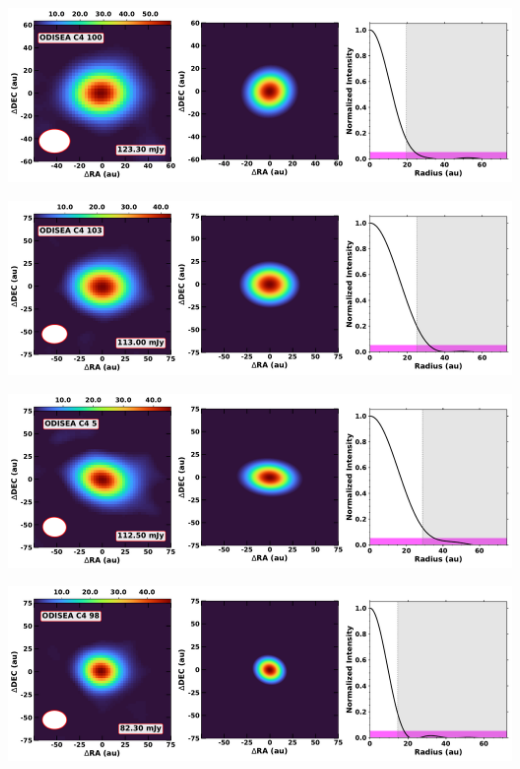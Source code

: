 \noindent
\begin{minipage}{.49\textwidth}
	 \centering
	 	 \hrulesep
	 	 \includegraphics[width=1\linewidth]{pdf/0+II/070_odisea_c4_100_cutout.pdf}
\end{minipage}%
\vrulesep
\begin{minipage}{.49\textwidth}
	 \centering
	 	 \hrulesep
	 	 \includegraphics[width=1\linewidth]{pdf/0+II/067_odisea_c4_103_cutout.pdf}
\end{minipage}%
\vspace{0pt}
\begin{minipage}{.49\textwidth}
	 \centering
	 	 \hrulesep
	 	 \includegraphics[width=1\linewidth]{pdf/0+II/066_odisea_c4_5_cutout.pdf}
\end{minipage}%
\vrulesep
\begin{minipage}{.49\textwidth}
	 \centering
	 	 \hrulesep
	 	 \includegraphics[width=1\linewidth]{pdf/0+II/059_odisea_c4_98_cutout.pdf}
\end{minipage}%
